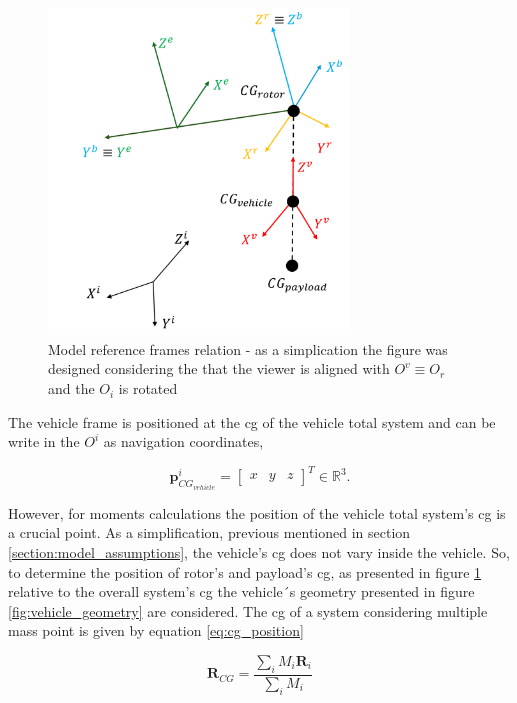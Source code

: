 \begin{figure}[!htb]
    \centering
        \includegraphics[width=8cm]{Figures/implementation/model/reference_frames_img.png}
        \caption{Model reference frames relation - as a simplication the figure was designed considering the that the viewer is aligned with $O^v \equiv O_r$ and the $O_i$ is rotated}
        \label{fig:reference_frames_img}
\end{figure}

The vehicle frame is positioned at the \gls{cg} of the vehicle total system and can be write in the $O^i$ as navigation coordinates,

\begin{equation}
    \mathbf{p}^i_{CG_{vehicle}} = \begin{bmatrix} x & y & z \end{bmatrix}^T \in \mathbb{R}^3.
\end{equation}

However, for moments calculations the position of the vehicle total system's \gls{cg} is a crucial point. As a simplification, previous mentioned in section \ref{section:model_assumptions}, the vehicle's \gls{cg} does not vary inside the vehicle. So, to determine the position of rotor's and payload's \gls{cg}, as presented in figure \ref{fig:reference_frames_img} relative to the overall system's \gls{cg} the vehicle´s geometry presented in figure \ref{fig:vehicle_geometry} are considered. The \gls{cg} of a system considering multiple mass point is given by equation \ref{eq:cg_position}

\begin{equation}
    \mathbf{R}_{CG} = \frac{\sum_{i} M_i \mathbf{R}_i}{\sum_{i} M_i}
    \label{eq:cg_position}
\end{equation}

